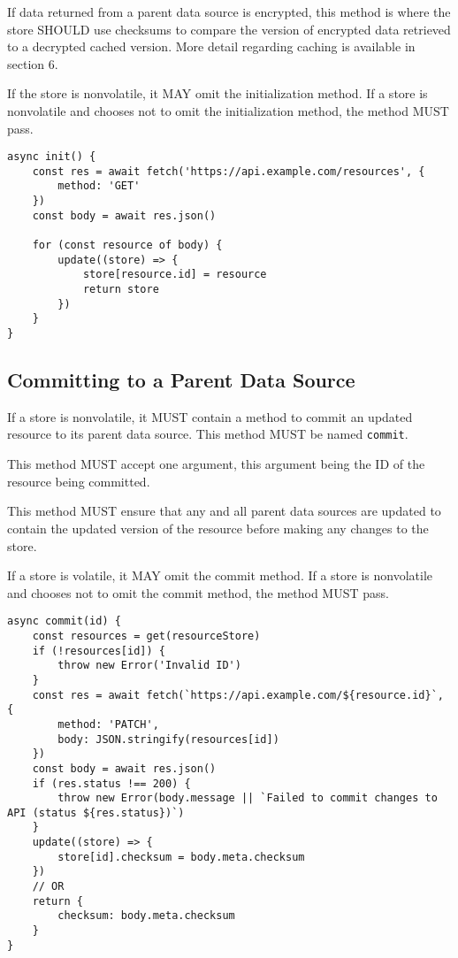 \documentclass{article}
\begin{document}
If data returned from a parent data source is encrypted, this method is where the store SHOULD use checksums to compare the version of encrypted data retrieved to a decrypted cached version. More detail regarding caching is available in section 6.

If the store is nonvolatile, it MAY omit the initialization method. If a store is nonvolatile and chooses not to omit the initialization method, the method MUST pass.

\begin{lstlisting}[caption=Initialization Method]
async init() {
    const res = await fetch('https://api.example.com/resources', {
        method: 'GET'
    })
    const body = await res.json()
    
    for (const resource of body) {
        update((store) => {
            store[resource.id] = resource
            return store
        })
    }
}
\end{lstlisting}

\subsection{Committing to a Parent Data Source}
\label{commit}
If a store is nonvolatile, it MUST contain a method to commit an updated resource to its parent data source. This method MUST be named \verb|commit|. 

This method MUST accept one argument, this argument being the ID of the resource being committed.

This method MUST ensure that any and all parent data sources are updated to contain the updated version of the resource before making any changes to the store.

If a store is volatile, it MAY omit the commit method. If a store is nonvolatile and chooses not to omit the commit method, the method MUST pass.

\begin{lstlisting}[caption=Commit Method]
async commit(id) {
    const resources = get(resourceStore)
    if (!resources[id]) {
        throw new Error('Invalid ID')
    }
    const res = await fetch(`https://api.example.com/${resource.id}`, {
        method: 'PATCH',
        body: JSON.stringify(resources[id])
    })
    const body = await res.json()
    if (res.status !== 200) {
        throw new Error(body.message || `Failed to commit changes to API (status ${res.status})`)
    }
    update((store) => {
        store[id].checksum = body.meta.checksum
    })
    // OR
    return {
        checksum: body.meta.checksum
    }
}
\end{lstlisting}
\end{document}
